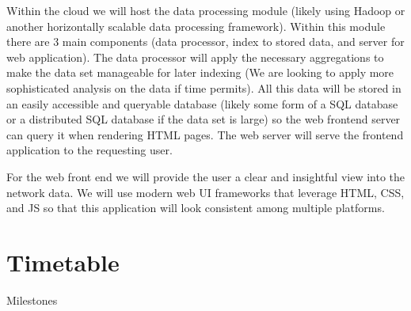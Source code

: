 \documentclass{sig-alternate}
\begin{document}
Within the cloud we will host the data processing module (likely using Hadoop or
another horizontally scalable data processing framework). Within this module
there are 3 main components (data processor, index to stored data, and server
for web application). The data processor will apply the necessary aggregations
to make the data set manageable for later indexing (We are looking to apply more
sophisticated analysis on the data if time permits). All this data will be
stored in an easily accessible and queryable database (likely some form of a SQL
database or a distributed SQL database if the data set is large) so the web
frontend server can query it when rendering HTML pages. The web server will
serve the frontend application to the requesting user.

For the web front end we will provide the user a clear and insightful view into
the network data. We will use modern web UI frameworks that leverage HTML, CSS,
and JS so that this application will look consistent among multiple platforms.

\section{Timetable}

Milestones




\nocite{*}
\end{document}
